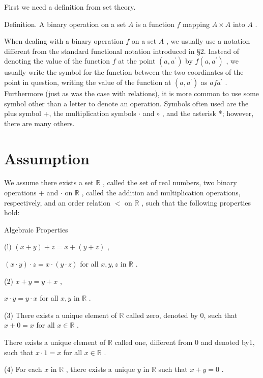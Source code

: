 \documentclass[10pt]{article}
\begin{document}
First we need a definition from set theory.

Definition. A binary operation on a set \(A\) is a function \(f\) mapping \(A \times  A\) into \(A\) .

When dealing with a binary operation \(f\) on a set \(A\) , we usually use a notation different from the standard functional notation introduced in §2. Instead of denoting the value of the function \(f\) at the point \(\left( {a,{a}^{\prime }}\right)\) by \(f\left( {a,{a}^{\prime }}\right)\) , we usually write the symbol for the function between the two coordinates of the point in question, writing the value of the function at \(\left( {a,{a}^{\prime }}\right)\) as \({af}{a}^{\prime }\) . Furthermore (just as was the case with relations), it is more common to use some symbol other than a letter to denote an operation. Symbols often used are the plus symbol +, the multiplication symbols \(\cdot\) and \(\circ\) , and the asterisk *; however, there are many others.

\section*{Assumption}

We assume there exists a set \(\mathbb{R}\) , called the set of real numbers, two binary operations + and \(\cdot\) on \(\mathbb{R}\) , called the addition and multiplication operations, respectively, and an order relation \(<\) on \(\mathbb{R}\) , such that the following properties hold:

Algebraic Properties

(l) \(\left( {x + y}\right)  + z = x + \left( {y + z}\right)\) ,

\(\left( {x \cdot  y}\right)  \cdot  z = x \cdot  \left( {y \cdot  z}\right)\) for all \(x,y,z\) in \(\mathbb{R}\) .

(2) \(x + y = y + x\) ,

\(x \cdot  y = y \cdot  x\) for all \(x,y\) in \(\mathbb{R}\) .

(3) There exists a unique element of \(\mathbb{R}\) called zero, denoted by 0, such that \(x + 0 = x\) for all \(x \in  \mathbb{R}\) .

There exists a unique element of \(\mathbb{R}\) called one, different from 0 and denoted by1, such that \(x \cdot  1 = x\) for all \(x \in  \mathbb{R}\) .

(4) For each \(x\) in \(\mathbb{R}\) , there exists a unique \(y\) in \(\mathbb{R}\) such that \(x + y = 0\) .
\end{document}
